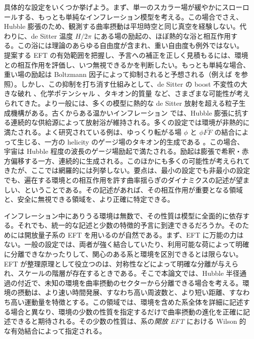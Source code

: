 \documentclass[a4paper,11pt]{ltjsarticle}
\numberwithin{equation}{section}
\begin{document}
具体的な設定をいくつか挙げよう。まず、単一のスカラー場が緩やかにスローロールする、もっとも単純なインフレーション模型を考える。この場合でさえ、Hubble 膨張のため、観測する曲率摂動は平坦時空と同じ真空を経験しない。代わりに、de Sitter 温度 $H/2\pi$ にある場の励起の、ほぼ熱的な浴と相互作用する。この浴には理論のあらゆる自由度が含まれ、重い自由度も例外ではない。提案する EFT の有効範囲を把握し、予言への補正を正しく見積もるには、環境との相互作用を評価し、いつ無視できるかを判断したい。もっとも単純な場合、重い場の励起は Boltzmann 因子によって抑制されると予想される（例えば \cite{Arkani-Hamed:2015bza,Tong:2021wai} を参照）。しかし、この抑制を打ち消す仕組みとして、de Sitter の boost 不変性の大きな破れ \cite{Lee:2016vti}、化学ポテンシャル \cite{Chen:2018xck,Wang:2019gbi,Bodas:2020yho,Tong:2022cdz,Sou:2021juh}、タキオン的質量 \cite{McCulloch:2024hiz} など、さまざまな可能性が考えられてきた。より一般には、多くの模型に熱的な de Sitter 放射を超える粒子生成機構がある。古くからある温かいインフレーション \cite{Berera:1995wh,Berera:1995ie,Berera:2023liv} では、Hubble 膨張に抗する連続的な供給源によって放射浴が維持される。多くの設定では環境が非熱的に満たされる。よく研究されている例は、ゆっくり転がる場 $\phi$ と $\phi F\tilde F$ の結合によって生じる、一方の helicity のゲージ場のタキオン的生成である \cite{Anber:2009ua}。この場合、宇宙は Hubble 程度の波長のゲージ場励起で満たされる。励起は膨張で希釈・赤方偏移する一方、連続的に生成される。このほかにも多くの可能性が考えられてきたが、ここでは網羅的には列挙しない。要点は、最小の設定でも非最小の設定でも、遍在する環境との相互作用を許す曲率揺らぎのダイナミクスの記述が望ましい、ということである。その記述があれば、その相互作用が重要となる領域と、安全に無視できる領域を、より正確に特定できる。

インフレーション中にありうる環境は無数で、その性質は模型に全面的に依存する。それでも、統一的な記述と少数の特徴的予言に到達できるだろうか。そのためには開放量子系の EFT を用いるのが自然である。まず、EFT に万能の力はない。一般の設定では、両者が強く結合していたり、利用可能な荷によって明確に分離できなかったりして、関心のある系と環境を区別できるとは限らない。EFT が整理原理として役立つのは、対称性などによって明確な分離が与えられ、スケールの階層が存在するときである。そこで本論文では、Hubble 半径通過の付近で、未知の環境を曲率摂動のセクターから分離できる場合を考える。環境の摂動は、より速い時間発展、すなわち高い周波数と、より短い距離、すなわち高い運動量を特徴とする。この領域では、環境を含めた系全体を詳細に記述する場合と異なり、環境の少数の性質を指定するだけで曲率摂動の進化を正確に記述できると期待される。その少数の性質は、系の\textit{開放 EFT} における Wilson 的な有効結合によって指定される。
\end{document}
